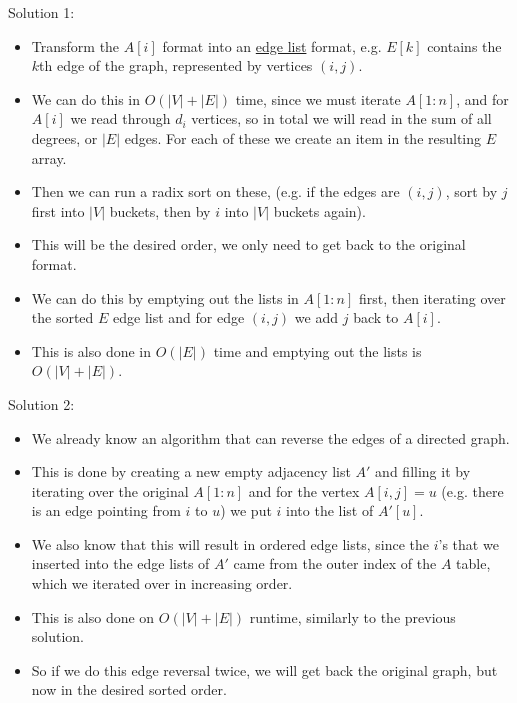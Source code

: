Solution 1:
\begin{itemize}
    \item Transform the $A[i]$ format into an \href{https://en.wikipedia.org/wiki/Edge_list}{edge list} format, e.g. $E[k]$ contains the $k$th edge of the graph, represented by vertices $(i,j)$.
    \item We can do this in $O(|V|+|E|)$ time, since we must iterate $A[1:n]$, and for $A[i]$ we read through $d_i$ vertices, so in total we will read in the sum of all degrees, or $|E|$ edges. For each of these we create an item in the resulting $E$ array.
    \item Then we can run a radix sort on these, (e.g. if the edges are $(i,j)$, sort by $j$ first into $|V|$ buckets, then by $i$ into $|V|$ buckets again).
    \item This will be the desired order, we only need to get back to the original format.
    \item We can do this by emptying out the lists in $A[1:n]$ first, then iterating over the sorted $E$ edge list and for edge $(i,j)$ we add $j$ back to $A[i]$.
    \item This is also done in $O(|E|)$ time and emptying out the lists is $O(|V|+|E|)$.
\end{itemize}

Solution 2:
\begin{itemize}
    \item We already know an algorithm that can reverse the edges of a directed graph.
    \item This is done by creating a new empty adjacency list $A'$ and filling it by iterating over the original $A[1:n]$ and for the vertex $A[i,j]=u$ (e.g. there is an edge pointing from $i$ to $u$) we put $i$ into the list of $A'[u]$.
    \item We also know that this will result in ordered edge lists, since the $i$'s that we inserted into the edge lists of $A'$ came from the outer index of the $A$ table, which we iterated over in increasing order.
    \item This is also done on $O(|V|+|E|)$ runtime, similarly to the previous solution.
    \item So if we do this edge reversal twice, we will get back the original graph, but now in the desired sorted order.
\end{itemize}
